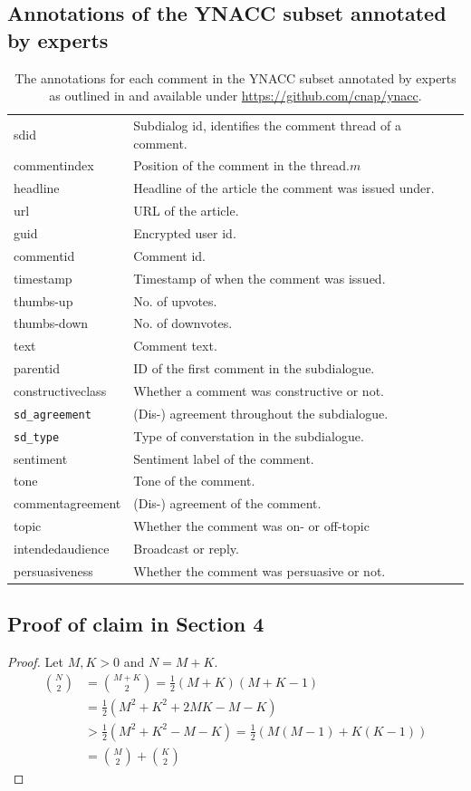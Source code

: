 \newpage
\subsection{Annotations of the YNACC subset annotated by experts}
\label{ynacclabel}
\begin{table}[H]
\caption{The annotations for each comment in the YNACC subset annotated by experts as outlined in \cite{napoles2017ynacc} and available under \url{https://github.com/cnap/ynacc}.}
\begin{tabular}{ll}
\hline
sdid & Subdialog id, identifies the comment thread of a comment.\\
commentindex & Position of the comment in the thread.$m$ \\
headline & Headline of the article the comment was issued under.\\
url & URL of the article. \\
guid & Encrypted user id. \\
commentid & Comment id.\\
timestamp & Timestamp of when the comment was issued. \\
thumbs-up & No. of upvotes. \\
thumbs-down & No. of downvotes.\\
text & Comment text. \\
parentid & ID of the first comment in the subdialogue. \\
constructiveclass & Whether a comment was constructive or not. \\
\texttt{sd\_agreement} & (Dis-) agreement throughout the subdialogue. \\
\texttt{sd\_type} & Type of converstation in the subdialogue. \\
sentiment & Sentiment label of the comment. \\
tone & Tone of the comment. \\
commentagreement & (Dis-) agreement of the comment. \\
topic & Whether the comment was on- or off-topic \\
intendedaudience & Broadcast or reply. \\
persuasiveness & Whether the comment was persuasive or not.
\end{tabular}
\end{table}

\newpage

\subsection{Proof of claim in Section 4}
\begin{proof}
\label{partitionproof}
Let $M,K >0$ and $N = M+K$.
\begin{align}
\binom{N}{2} &= \binom{M+K}{2} = \frac{1}{2}(M+K)(M+K-1) \\
&= \frac{1}{2}(M^2+K^2+2MK-M-K) \\
&> \frac{1}{2}(M^2+K^2-M-K) = \frac{1}{2}\left(M(M-1)+K(K-1)\right) \\
&= \binom{M}{2}+\binom{K}{2}
\end{align}
\end{proof}

